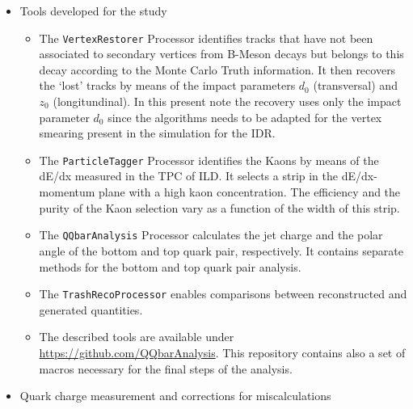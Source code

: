 \documentclass[preprint]{elsarticle}
\begin{document}
\begin{itemize}
\item Tools developed for the study
  \begin{itemize}
  \item The \texttt{VertexRestorer} Processor identifies tracks that have not been associated to secondary vertices from B-Meson decays but belongs to this decay according to the Monte Carlo Truth information. It then recovers the `lost' tracks by means of the impact parameters $d_0$ (transversal) and $z_0$ (longitundinal).     
In this present note the recovery uses only the impact parameter $d_0$ since the algorithms needs to be adapted for the vertex smearing present in the simulation for the IDR. 
\item The \texttt{ParticleTagger} Processor identifies the Kaons by means of the dE/dx measured in the TPC of ILD. It selects a strip in the dE/dx-momentum plane with a high kaon concentration. The efficiency and the purity of the Kaon selection vary as a function of the width of this strip. 
\item The \texttt{QQbarAnalysis} Processor calculates the jet charge and the polar angle of the bottom and top quark pair, respectively. It contains separate  methods for the bottom and top quark pair analysis.
 
\item The \texttt{TrashRecoProcessor} enables comparisons between reconstructed and generated quantities. 

\item The described tools are available under \url{https://github.com/QQbarAnalysis}. This repository contains also a set of macros necessary for the final steps of the analysis.

\end{itemize}



\item Quark charge measurement and corrections for miscalculations


\end{itemize}
\end{document}
